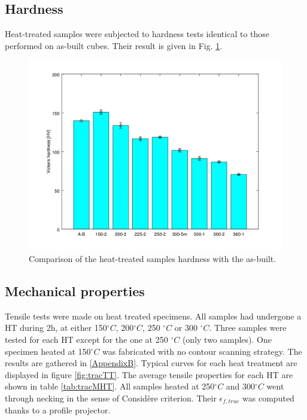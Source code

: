 \subsection{Hardness}

Heat-treated samples were subjected to hardness tests identical to those performed on as-built cubes. Their result is given in Fig. \ref{fig:hardness}.

\begin{figure}[ht]
	\centering
	\centerline{\includegraphics[scale=0.6]{Images/hardness.png}}
	\decoRule
	\caption[Comparison of the heat-treated samples hardness with the as-built.]{Comparison of the heat-treated samples hardness with the as-built.}
	\label{fig:hardness}
\end{figure}


\subsection{Mechanical properties}

Tensile tests were made on heat treated specimens. All samples had undergone a HT during 2h, at either 150$^\circ C$, 200$^\circ C$, 250 $^\circ C$ or 300 $^\circ C$. Three samples were tested for each HT except for the one at 250 $^\circ C$ (only two samples). One specimen heated at 150$^\circ C$ was fabricated with no contour scanning strategy. The results are gathered in \ref{AppendixB}. Typical curves for each heat treatment are displayed in figure \ref{fig:tracTT}. The average tensile properties for each HT are shown in table \ref{tab:tracMHT}. All samples heated at 250$^\circ C$ and 300$^\circ C$ went through necking in the sense of Considère criterion. Their $\epsilon_{f,true}$ was computed thanks to a profile projector. \\

